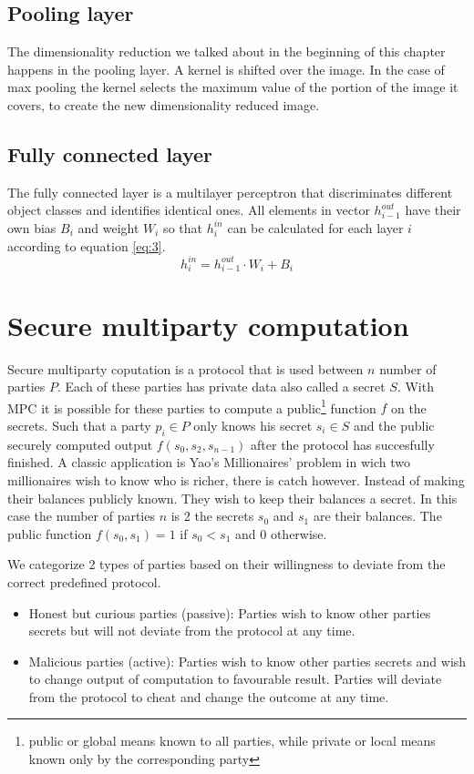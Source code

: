 \subsection{Pooling layer}
The dimensionality reduction we talked about in the beginning of this chapter happens in the pooling layer. A kernel is shifted over the image. In the case of max pooling the kernel selects the maximum value of the portion of the image it covers, to create the new dimensionality reduced image.

\subsection{Fully connected layer}
The fully connected layer is a multilayer perceptron that discriminates different object classes and identifies identical ones. All elements in vector $h_{i-1}^{out}$ have their own bias $B_i$ and weight $W_i$ so that $h_i^{in}$ can be calculated for each layer $i$ according to equation \ref{eq:3}.
\begin{equation} \label{eq:3}
  h_i^{in} = h_{i-1}^{out} \cdot W_i + B_i
\end{equation}

\section{Secure multiparty computation}
Secure multiparty coputation is a protocol that is used between $n$ number of parties $P$. Each of these parties has private data also called a secret $S$. With MPC it is possible for these parties to compute a public\footnote{public or global means known to all parties, while private or local means known only by the corresponding party} function $f$ on the secrets. Such that a party $p_i \in P$ only knows his secret $s_i \in S$ and the public securely computed output $f(s_0,s_2,s_{n-1})$ after the protocol has succesfully finished.
\newline
A classic application is Yao's Millionaires' problem \cite{yao1982protocols} in wich two millionaires wish to know who is richer, there is catch however. Instead of making their balances publicly known. They wish to keep their balances a secret. In this case the number of parties $n$ is 2 the secrets $s_0$ and $s_1$ are their balances. The public function $f(s_0,s_1)=1$ if $s_0<s_1$ and $0$ otherwise.

We categorize 2 types of parties based on their willingness to deviate from the correct predefined protocol.
\begin{itemize}
  \item Honest but curious parties (passive): Parties wish to know other parties secrets but will not deviate from the protocol at any time.
  \item Malicious parties (active): Parties wish to know other parties secrets and wish to change output of computation to favourable result. Parties will deviate from the protocol to cheat and change the outcome at any time.
\end{itemize}

